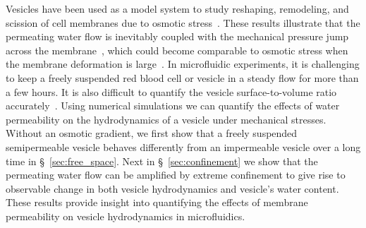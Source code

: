 \documentclass[prb,preprint,showpacs,preprintnumbers,amsmath,amssymb,longbibliography]{revtex4-1}
\begin{document}
Vesicles 
have been used as a
model system to study reshaping, remodeling, and scission of cell
membranes due to osmotic stress~\cite{OgleckaEtAl2014_eLife, BhatiaRobinsonDimova2020_SoftMatt,
CamposSaric2020_bioRxiv, Dimova2020_GVB, BhatiaChrist2020_SoftMatt}.
These results illustrate that the permeating water
flow is inevitably coupled with the mechanical pressure jump across the
membrane~\cite{yao-mor2017}, which could become comparable to osmotic
stress when the membrane deformation is large~\cite{LiMoriSun2015_PRL,
yao-mor2017}. 
%
In microfluidic experiments, it is challenging to keep a freely
suspended red blood cell or vesicle in a steady flow for more than a few
hours. It is also difficult to quantify the vesicle surface-to-volume
ratio accurately~\cite{MinetttiCallensCoupier2008_AppliedOptics}. Using
numerical simulations we can quantify the effects of water permeability
on the hydrodynamics of a vesicle under mechanical stresses.  Without an
osmotic gradient, we first show that a freely suspended semipermeable
vesicle behaves differently from an impermeable vesicle over a long
time in \S~\ref{sec:free_space}. Next in \S~\ref{sec:confinement} we show that
the permeating water flow can be amplified by extreme confinement to give rise to observable change in both  vesicle hydrodynamics and vesicle's water content. 
These results provide insight into quantifying the effects of membrane permeability on vesicle hydrodynamics in microfluidics.
%
 
\end{document}
